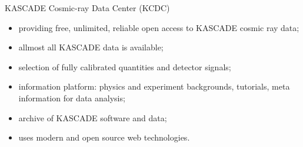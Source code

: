 \begin{frame}{KASCADE Cosmic-ray Data Center (KCDC)}
    \begin{itemize}
        \small
        \setlength{\itemsep}{0pt}
        \item providing free, unlimited, reliable open access to KASCADE cosmic ray data;
        \item allmost all KASCADE data is available;
        \item selection of fully calibrated quantities and detector signals;
        \item information platform: physics and experiment backgrounds, tutorials, meta information for data analysis;
        \item archive of KASCADE software and data;
        \item uses modern and open source web technologies.
    \end{itemize}


\end{frame}
